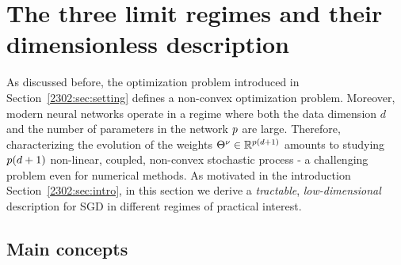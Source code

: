 \section[The three limit regimes]{The three limit regimes and their dimensionless description}

\label{2302:sec:regimes}
As discussed before, the optimization problem introduced in Section~\ref{2302:sec:setting} defines a non-convex optimization problem. Moreover, modern neural networks operate in a regime where both the data dimension $d$ and the number of parameters in the network $p$ are large. Therefore, characterizing the evolution of the weights $\Theta^{\nu}\in\mathbb{R}^{p(d+1)}$ amounts to studying $p(d+1)$ non-linear, coupled, non-convex stochastic process - a challenging problem even for numerical methods. As motivated in the introduction Section~\ref{2302:sec:intro}, in this section we derive a \emph{tractable}, \emph{low-dimensional} description for SGD in different regimes of practical interest. 

\subsection{Main concepts}

